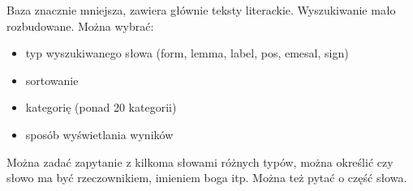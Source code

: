 Baza znacznie mniejsza, zawiera 
głównie teksty literackie. Wyszukiwanie mało rozbudowane. Można wybrać:
\begin{itemize}
 \item typ wyszukiwanego słowa (form, lemma, label, pos, emesal, sign)
 \item sortowanie
 \item kategorię (ponad 20 kategorii)
 \item sposób wyświetlania wyników
\end{itemize}

Można zadać zapytanie z kilkoma słowami różnych typów, można określić czy słowo ma być rzeczownikiem, imieniem boga itp. Można też pytać o część słowa.